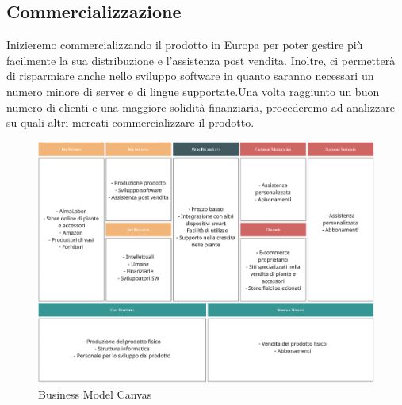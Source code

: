 \subsection{Commercializzazione}

Inizieremo commercializzando il prodotto in Europa per poter gestire più facilmente la sua distribuzione e l'assistenza post vendita. Inoltre, ci permetterà di risparmiare anche nello sviluppo software in quanto saranno necessari un numero minore di server e di lingue supportate.\newline Una volta raggiunto un buon numero di clienti e una maggiore solidità finanziaria, procederemo ad analizzare su quali altri mercati commercializzare il prodotto.

\begin{figure}[ht!]
	\centering
	\includegraphics[width=\textwidth]{./images/Business-Model-Canvas.PNG} 
	\caption{Business Model Canvas \label{overflow}}
\end{figure}